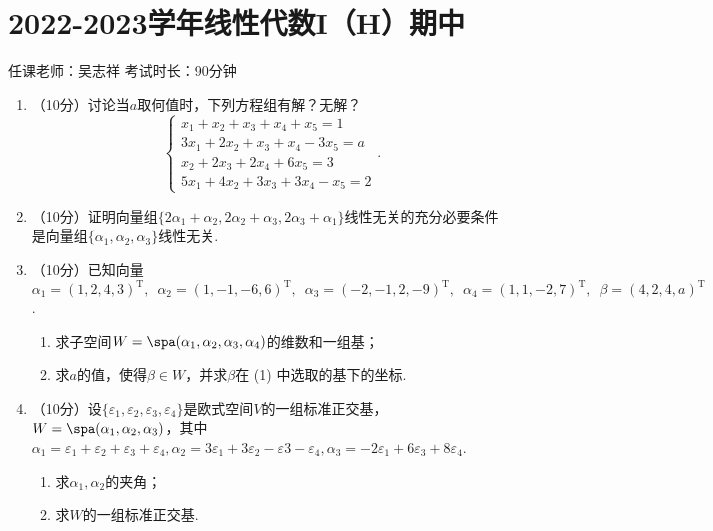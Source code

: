 \section{2022-2023学年线性代数I（H）期中}

\begin{center}
    任课老师：吴志祥\hspace{4em} 考试时长：90分钟
\end{center}

\begin{enumerate}
    \item （10分）讨论当$a$取何值时，下列方程组有解？无解？
    \[\begin{cases}
        x_1+x_2+x_3+x_4+x_5=1 \\
        3x_1+2x_2+x_3+x_4-3x_5=a \\
        x_2+2x_3+2x_4+6x_5=3 \\
        5x_1+4x_2+3x_3+3x_4-x_5=2
    \end{cases}.\]

    \item （10分）证明向量组$\{2\alpha_1+\alpha_2,2\alpha_2+\alpha_3,2\alpha_3+\alpha_1\}$线性无关的充分必要条件是向量组$\{\alpha_1,\alpha_2,\alpha_3\}$线性无关.

    \item （10分）已知向量$\alpha_1=(1,2,4,3)^\mathrm{T},\enspace \alpha_2=(1,-1,-6,6)^\mathrm{T},\enspace \alpha_3=(-2,-1,2,-9)^\mathrm{T},\enspace \alpha_4=(1,1,-2,7)^\mathrm{T},\enspace \beta=(4,2,4,a)^\mathrm{T}$.
       \begin{enumerate}
        \item 求子空间$W=\spa(\alpha_1,\alpha_2,\alpha_3,\alpha_4)$的维数和一组基；

        \item 求$a$的值，使得$\beta\in W$，并求$\beta$在 (1) 中选取的基下的坐标.
    \end{enumerate}

    \item （10分）设$\{\varepsilon_1,\varepsilon_2,\varepsilon_3,\varepsilon_4\}$是欧式空间$V$的一组标准正交基，$W=\spa(\alpha_1,\alpha_2,\alpha_3)$，其中$\alpha_1=\varepsilon_1+\varepsilon_2+\varepsilon_3+\varepsilon_4,\alpha_2=3\varepsilon_1+3\varepsilon_2-\varepsilon3-\varepsilon_4,\alpha_3=-2\varepsilon_1+6\varepsilon_3+8\varepsilon_4$.
    \begin{enumerate}
           \item 求$\alpha_1,\alpha_2$的夹角；

        \item 求$W$的一组标准正交基.
    \end{enumerate}


\end{enumerate}
